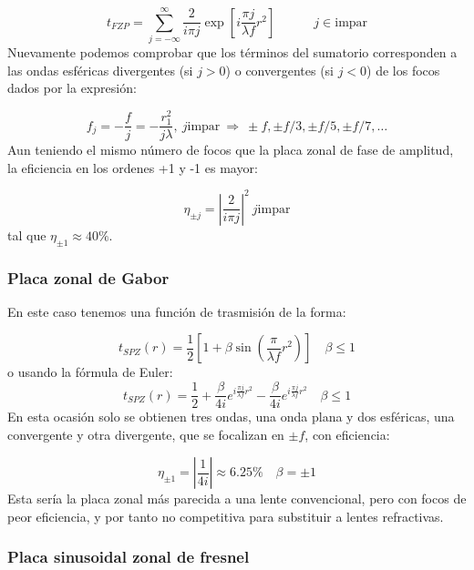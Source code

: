 \documentclass[12pt,a4paper]{book}
\numberwithin{equation}{section}
\numberwithin{figure}{section}
\newcommand{\tquad}{\quad \quad \quad}
\newcommand{\parentesis}[1]{\left( #1  \right)}
\newcommand{\ccorchetes}[1]{\left[ #1  \right]}
\newcommand{\1}{_{(1)}}
\newcommand{\2}{_{(2)}}
\theoremstyle{definition}
\begin{document}
\begin{equation}
    t_{FZP} =  \sum_{j = - \infty}^{\infty} \frac{2}{i \pi j} \exp \ccorchetes{i \frac{\pi j}{\lambda f} r^2} \tquad  j \in \text{impar}
\end{equation}
Nuevamente podemos comprobar que los términos del sumatorio corresponden a las ondas esféricas divergentes (si $j>0$) o convergentes (si $j<0$) de los focos dados por la expresión:

\begin{equation}
    f_j = - \frac{f}{j} = - \frac{r_1^2}{j \lambda}, \ j \text{impar} \ \Rightarrow \ \pm f,\pm f/3,\pm f/5, \pm f/7, \ldots
\end{equation}
Aun teniendo el mismo número de focos que la placa zonal de fase de amplitud, la eficiencia en los ordenes +1 y -1 es mayor:

\begin{equation}
    \eta_{\pm j} = \left|\frac{2}{i\pi j}\right|^2 \ j \text{impar}
\end{equation}
tal que $\eta_{\pm1}\approx 40\%$.

\subsubsection{Placa zonal de Gabor}

En este caso tenemos una función de trasmisión de la forma:

\begin{equation}
    t_{SPZ} (r) = \frac{1}{2} \ccorchetes{1+\beta \sin \parentesis{\frac{\pi}{\lambda f} r^2}} \quad \beta \leq 1
\end{equation}
o usando la fórmula de Euler:
\begin{equation}
    t_{SPZ} (r) = \frac{1}{2} + \frac{\beta}{4i} e^{i\frac{\pi j}{\lambda f} r^2} -
    \frac{\beta}{4i} e^{i\frac{\pi j}{\lambda f} r^2}
    \quad \beta \leq 1
\end{equation}
En esta ocasión solo se obtienen tres ondas, una onda plana y dos esféricas, una convergente y otra divergente, que se focalizan en $\pm f$, con eficiencia:

\begin{equation}
    \eta_{\pm 1} = \left| \frac{1}{4i} \right| \approx 6.25 \% \quad \beta=\pm 1
\end{equation}
Esta sería la placa zonal más parecida a una lente convencional, pero con focos de peor eficiencia, y por tanto no competitiva para substituir a lentes refractivas. 

\subsubsection{Placa sinusoidal zonal de fresnel}
\end{document}
